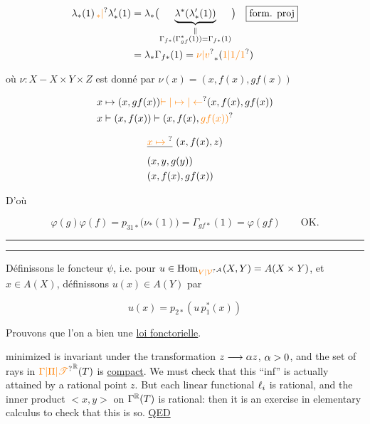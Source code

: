 \[
\begin{aligned}
\lambda_*(1)\,\unsure{{}_*|{}}\lambda'_*(1)&=\lambda_*\bigl(\underbrace{\lambda^*(\lambda'_*(1))}_{\substack{\Vert\\\Gamma_{f*}(\Gamma_{gf}^*(1))=\Gamma_{f*}(1)}}\bigr)\quad\boxed{\text{form. proj}}\\
&=\lambda_*\Gamma_{f*}(1)=\unsure{\nu|v}_*(\unsure{1|1/1})
\end{aligned}
\]

où $\nu:X\mathbin{-}X\times Y\times Z$ est donné par $\nu(x)=(x,f(x),gf(x))$

\[
\begin{aligned}
x&\mapsto (x,gf(x))\unsure{\vdash|\mapsto|\leftarrow} (x,f(x),gf(x))\\
x&\vdash (x,f(x))\vdash (x,f(x),\unsure{gf(x))}
\end{aligned}
\]

\[
\begin{aligned}
&\deleted{\unsure{x\mapsto{}}}\ (x,f(x),z)\\
&(x,y,g(y))\\
&(x,f(x),gf(x))
\end{aligned}
\]

D'où

\[
\varphi(g)\varphi(f)=p_{31*}\bigl(\nu_*(1)\bigr)=\Gamma_{gf*}(1)=\varphi(gf)\qquad\text{OK.}
\]

\noindent\rule{3.5cm}{0.3pt}\par\nobreak\vspace{-0.8\baselineskip}\noindent\rule{3.6cm}{0.3pt}

Définissons le foncteur $\psi$,  i.e. pour $u\in\operatorname{Hom}_{\unsure{V|\mathcal V}^{\mathcal A}}(X,Y)=A(X\times Y)$, et $x\in A(X)$, définissons $u(x)\in A(Y)$ par  

\[
u(x)=p_{2*}(u\,p_1^*(x))
\]

Prouvons que l'on a bien une \uline{loi fonctorielle}.


minimized is invariant under the transformation $z\longrightarrow\alpha z$, $\alpha>0$, and the set of rays in $\handwritten{\unsure{\Gamma|\Pi|\mathscr T}^{\mathbb R}}(T)$ is \uline{compact}. We must check that this ``inf'' is actually attained by a rational point $z$. But each linear functional $\ell_i$ is rational, and the inner product $<x,y>$ on $\Gamma^{\mathbb R}(T)$ is rational: then it is an exercise in elementary calculus to check that this is so. \uline{QED}

